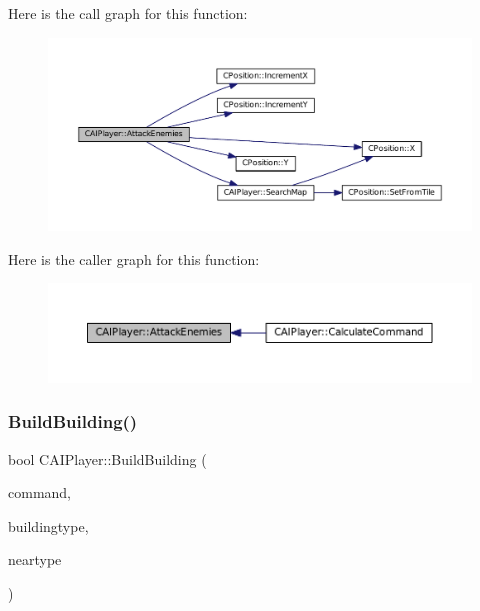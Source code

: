 Here is the call graph for this function\+:\nopagebreak
\begin{figure}[H]
\begin{center}
\leavevmode
\includegraphics[width=350pt]{classCAIPlayer_adf7feeba7debf9f19b000887616d7bfb_cgraph}
\end{center}
\end{figure}
Here is the caller graph for this function\+:\nopagebreak
\begin{figure}[H]
\begin{center}
\leavevmode
\includegraphics[width=350pt]{classCAIPlayer_adf7feeba7debf9f19b000887616d7bfb_icgraph}
\end{center}
\end{figure}
\hypertarget{classCAIPlayer_a2ff5263cbaa6bfc62ffec4dbce87ba88}{}\label{classCAIPlayer_a2ff5263cbaa6bfc62ffec4dbce87ba88} 
\subsubsection{\texorpdfstring{Build\+Building()}{BuildBuilding()}}
{\footnotesize\ttfamily bool C\+A\+I\+Player\+::\+Build\+Building (\begin{DoxyParamCaption}\item[{\hyperlink{structSPlayerCommandRequest}{S\+Player\+Command\+Request} \&}]{command,  }\item[{\hyperlink{GameDataTypes_8h_a5600d4fc433b83300308921974477fec}{E\+Asset\+Type}}]{buildingtype,  }\item[{\hyperlink{GameDataTypes_8h_a5600d4fc433b83300308921974477fec}{E\+Asset\+Type}}]{neartype }\end{DoxyParamCaption})\hspace{0.3cm}{\ttfamily [protected]}}



